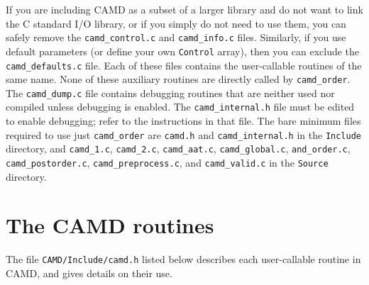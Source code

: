 \documentclass[11pt]{article}
\begin{document}
If you are including CAMD as a subset of a larger library and do not want
to link the C standard I/O library, or if you simply do not need to use
them, you can safely remove the {\tt camd\_control.c} and {\tt camd\_info.c}
files.  Similarly, if you use default parameters (or define your
own {\tt Control} array), then you can exclude the {\tt camd\_defaults.c}
file.
Each of these files contains the user-callable routines of the same
name.  None of these auxiliary routines are directly called by
{\tt camd\_order}.
The {\tt camd\_dump.c} file contains debugging routines
that are neither used nor compiled unless debugging is enabled.
The {\tt camd\_internal.h} file must be edited to enable debugging;
refer to the instructions in that file.
The bare minimum files required to use just {\tt camd\_order} are
{\tt camd.h} and {\tt camd\_internal.h}
in the {\tt Include} directory,
and
{\tt camd\_1.c},
{\tt camd\_2.c},
{\tt camd\_aat.c},
{\tt camd\_global.c},
{\tt and\_order.c},
{\tt camd\_postorder.c},
{\tt camd\_preprocess.c},
and
{\tt camd\_valid.c}
in the {\tt Source} directory.

\newpage
\section{The CAMD routines}
\label{Primary}

The file {\tt CAMD/Include/camd.h} listed below
describes each user-callable routine in CAMD,
and gives details on their use.
\end{document}
